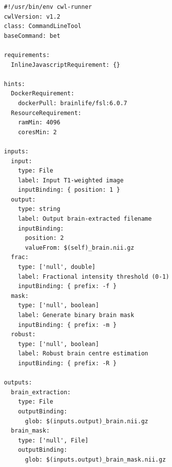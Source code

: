 \documentclass[border=5pt]{standalone}
\begin{document}
\begin{mdframed}[
  backgroundcolor=codebg,
  linecolor=frame,
  linewidth=0.5pt,
  roundcorner=3pt,
  innerleftmargin=8pt,
  innertopmargin=8pt,
  innerbottommargin=8pt
]
\begin{verbatim}
#!/usr/bin/env cwl-runner
cwlVersion: v1.2
class: CommandLineTool
baseCommand: bet

requirements:
  InlineJavascriptRequirement: {}

hints:
  DockerRequirement:
    dockerPull: brainlife/fsl:6.0.7
  ResourceRequirement:
    ramMin: 4096
    coresMin: 2

inputs:
  input:
    type: File
    label: Input T1-weighted image
    inputBinding: { position: 1 }
  output:
    type: string
    label: Output brain-extracted filename
    inputBinding:
      position: 2
      valueFrom: $(self)_brain.nii.gz
  frac:
    type: ['null', double]
    label: Fractional intensity threshold (0-1)
    inputBinding: { prefix: -f }
  mask:
    type: ['null', boolean]
    label: Generate binary brain mask
    inputBinding: { prefix: -m }
  robust:
    type: ['null', boolean]
    label: Robust brain centre estimation
    inputBinding: { prefix: -R }

outputs:
  brain_extraction:
    type: File
    outputBinding:
      glob: $(inputs.output)_brain.nii.gz
  brain_mask:
    type: ['null', File]
    outputBinding:
      glob: $(inputs.output)_brain_mask.nii.gz
\end{verbatim}
\end{mdframed}
\end{document}
